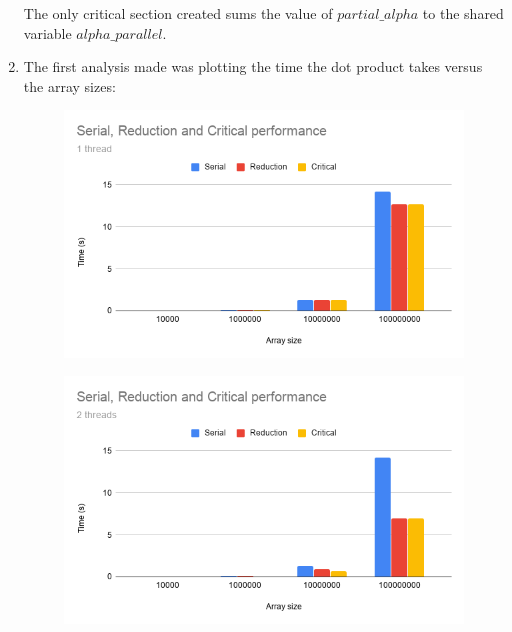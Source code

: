 \documentclass[unicode,11pt,a4paper,oneside,numbers=endperiod,openany]{scrartcl}
\begin{document}
\begin{enumerate}
        The only critical section created sums the value of $partial\_alpha$ to the shared variable $alpha\_parallel$. 

    \item %

        The first analysis made was plotting the time the dot product takes versus the array sizes:

        \begin{figure}[H]
            \centering
            \includegraphics[width=0.9\linewidth]{"Serial, Reduction and Critical Performance"}
        \end{figure}

        \begin{figure}[H]
            \centering
            \includegraphics[width=0.9\linewidth]{"Serial, Reduction and Critical Performance-2"}
        \end{figure}


\end{enumerate}
\end{document}
